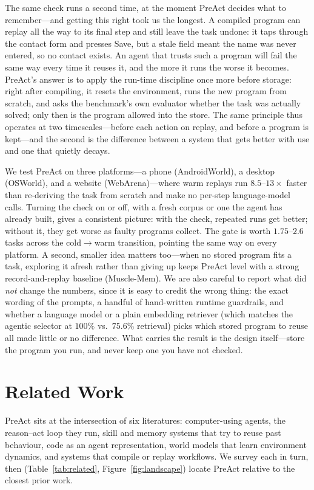 \documentclass[11pt]{article}
\begin{document}
The same check runs a second time, at the moment PreAct decides what to remember---and getting this right took us the longest. A compiled program can replay all the way to its final step and still leave the task undone: it taps through the contact form and presses Save, but a stale field meant the name was never entered, so no contact exists. An agent that trusts such a program will fail the same way every time it reuses it, and the more it runs the worse it becomes. PreAct's answer is to apply the run-time discipline once more before storage: right after compiling, it resets the environment, runs the new program from scratch, and asks the benchmark's own evaluator whether the task was actually solved; only then is the program allowed into the store. The same principle thus operates at two timescales---before each action on replay, and before a program is kept---and the second is the difference between a system that gets better with use and one that quietly decays.

We test PreAct on three platforms---a phone (AndroidWorld), a desktop (OSWorld), and a website (WebArena)---where warm replays run $8.5$--$13\times$ faster than re-deriving the task from scratch and make no per-step language-model calls. Turning the check on or off, with a fresh corpus or one the agent has already built, gives a consistent picture: with the check, repeated runs get better; without it, they get worse as faulty programs collect. The gate is worth $1.75$--$2.6$ tasks across the cold$\to$warm transition, pointing the same way on every platform. A second, smaller idea matters too---when no stored program fits a task, exploring it afresh rather than giving up keeps PreAct level with a strong record-and-replay baseline (Muscle-Mem). We are also careful to report what did \emph{not} change the numbers, since it is easy to credit the wrong thing: the exact wording of the prompts, a handful of hand-written runtime guardrails, and whether a language model or a plain embedding retriever (which matches the agentic selector at $100\%$ vs.\ $75.6\%$ retrieval) picks which stored program to reuse all made little or no difference. What carries the result is the design itself---store the program you run, and never keep one you have not checked.

\section{Related Work}
\label{sec:related}

PreAct sits at the intersection of six literatures: computer-using agents, the reason--act loop they run, skill and memory systems that try to reuse past behaviour, code as an agent representation, world models that learn environment dynamics, and systems that compile or replay workflows. We survey each in turn, then (Table~\ref{tab:related}, Figure~\ref{fig:landscape}) locate PreAct relative to the closest prior work.
\end{document}

